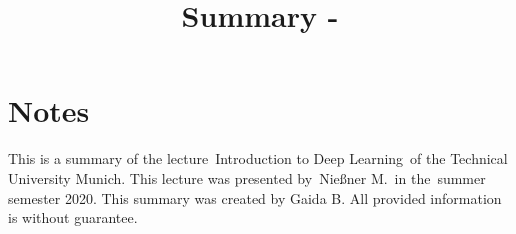 \documentclass[10pt,a4paper]{article}
\title{Summary - \lecture}
\author{}
\date{}
\newcommand{\lecture}{Introduction to Deep Learning} %
\newcommand{\lecturer}{Nießner M.} %
\newcommand{\semseter}{summer semester 2020} %
\begin{document}
\tableofcontents
\pagebreak

\section{}

\pagebreak
\section*{Notes}
This is a summary of the lecture~\lecture~of the Technical University Munich.
This lecture was presented by~\lecturer~in the~\semseter.
This summary was created by Gaida B.
All provided information is without guarantee.


\end{document}
